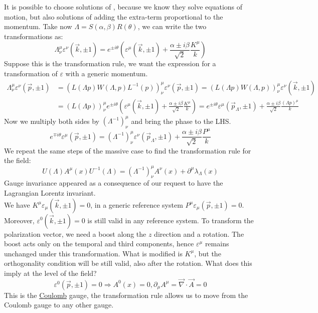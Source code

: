 \documentclass[../main.tex]{subfiles}
\begin{document}
It is possible to choose solutions of , because we know they solve equations of motion, but also solutions of  adding the extra-term proportional to the momentum. Take now $\Lambda=S(\alpha,\beta)R(\theta)$, we can write the two transformations as:
\[
\Lambda^\mu_\nu\varepsilon^\nu(\vec{k},\pm1)=e^{\pm i\theta}\left(\varepsilon^\mu(\vec{k},\pm1)+\frac{\alpha\pm i\beta}{\sqrt{2}}\frac{K^\mu}{k}\right)
\]
Suppose this is the transformation rule, we want the expression for a transformation of $\varepsilon$ with a generic momentum.
\begin{align*}
\Lambda^\mu_\nu\varepsilon^\nu(\vec{p},\pm1)&=\left(L(\Lambda p)W(\Lambda,p)L^{-1}(p)\right)^\mu_\nu\varepsilon^\nu(\vec{p},\pm1)=\left(L(\Lambda p)W(\Lambda,p)\right)^\mu_\nu\varepsilon^\nu(\vec{k},\pm1)\\
&=(L(\Lambda p))^\mu_\nu e^{\pm i\theta}\left(\varepsilon^\mu(\vec{k},\pm1)+\frac{\alpha\pm i\beta}{\sqrt{2}}\frac{K^\mu}{k}\right)=e^{\pm i\theta}\varepsilon^\mu(\vec{p}_\Lambda,\pm1)+\frac{\alpha\pm i\beta}{\sqrt{2}}\frac{(\Lambda p)^\mu}{k}
\end{align*}
Now we multiply both sides by $(\Lambda^{-1})^\mu_\nu$ and bring the phase to the LHS.
\[
e^{\mp i\theta}\varepsilon^\mu(\vec{p},\pm1)=(\Lambda^{-1})^\mu_\nu\varepsilon^\nu(\vec{p}_\Lambda,\pm1)+\frac{\alpha\pm i\beta}{\sqrt{2}}\frac{P^\mu}{k}
\]
We repeat the same steps of the massive case to find the transformation rule for the field:
\[
U(\Lambda)A^\mu(x)U^{-1}(\Lambda)=(\Lambda^{-1})^\mu_\nu A^\nu(x)+\partial^\mu\lambda_\Lambda(x)
\]
Gauge invariance appeared as a consequence of our request to have the Lagrangian Lorentz invariant.\\
We have $K^\mu\varepsilon_\mu(\vec{k},\pm1)=0$, in a generic reference system $P^\mu\varepsilon_\mu(\vec{p},\pm1)=0$. Moreover, $\varepsilon^0(\vec{k},\pm1)=0$ is still valid in any reference system. To transform the polarization vector, we need a boost along the $z$ direction and a rotation. The boost acts only on the temporal and third components, hence $\varepsilon^\mu$ remains unchanged under this transformation. What is modified is $K^\mu$, but the orthogonality condition will be still valid, also after the rotation. What does this imply at the level of the field? 
\[
\varepsilon^0(\vec{p},\pm1)=0\Rightarrow A^0(x)=0, \partial_\mu A^\mu=\vec{\nabla}\cdot\vec{A}=0
\]
This is the \href{https://en.wikipedia.org/wiki/Charles-Augustin_de_Coulomb}{Coulomb} gauge, the transformation rule allows us to move from the Coulomb gauge to any other gauge.
\end{document}
